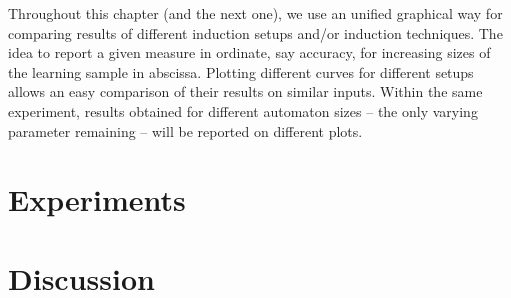 Throughout this chapter (and the next one), we use an unified graphical way for comparing results of different induction setups and/or induction techniques. The idea to report a given measure in ordinate, say accuracy, for increasing sizes of the learning sample in abscissa. Plotting different curves for different setups allows an easy comparison of their results on similar inputs. Within the same experiment, results obtained for different automaton sizes -- the only varying parameter remaining -- will be reported on different plots.


\section{Experiments\label{section:evaluation-experiments}}

\section{Discussion\label{section:evaluation-discussion}}
